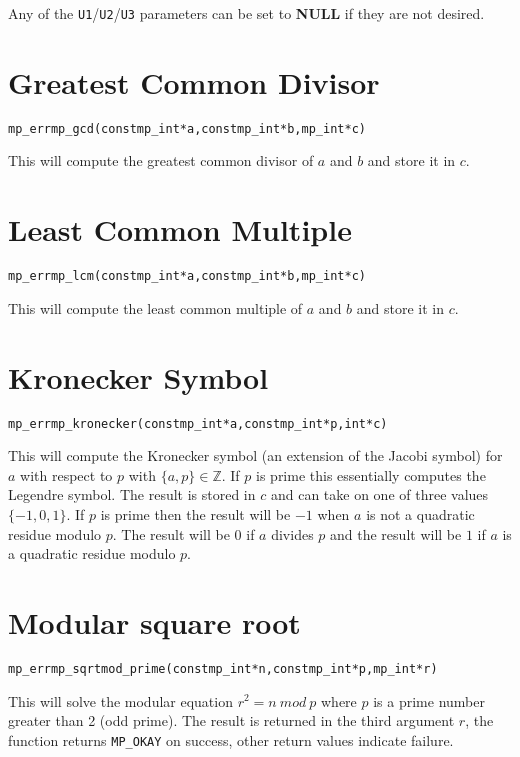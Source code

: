 \documentclass[synpaper]{book}
\def\mod{{\mathit\ mod\ }}
\begin{document}
Any of the \texttt{U1}/\texttt{U2}/\texttt{U3} parameters can be set to \textbf{NULL} if they are
not desired.

\section{Greatest Common Divisor}
\begin{alltt}
mp_err mp_gcd (const mp_int *a, const mp_int *b, mp_int *c)
\end{alltt}
This will compute the greatest common divisor of $a$ and $b$ and store it in $c$.

\section{Least Common Multiple}
\begin{alltt}
mp_err mp_lcm (const mp_int *a, const mp_int *b, mp_int *c)
\end{alltt}
This will compute the least common multiple of $a$ and $b$ and store it in $c$.

\section{Kronecker Symbol}
\begin{alltt}
mp_err mp_kronecker (const mp_int *a, const mp_int *p, int *c)
\end{alltt}
This will compute the Kronecker symbol (an extension of the Jacobi symbol) for $a$ with respect to
$p$ with $\lbrace a, p \rbrace \in \mathbb{Z}$.  If $p$ is prime this essentially computes the
Legendre symbol. The result is stored in $c$ and can take on one of three values $\lbrace -1, 0, 1
  \rbrace$.  If $p$ is prime then the result will be $-1$ when $a$ is not a quadratic residue
modulo
$p$.  The result will be $0$ if $a$ divides $p$ and the result will be $1$ if $a$ is a quadratic
residue modulo $p$.

\section{Modular square root}
\begin{alltt}
mp_err mp_sqrtmod_prime(const mp_int *n, const mp_int *p, mp_int *r)
\end{alltt}

This will solve the modular equation $r^2 = n \mod p$ where $p$ is a prime number greater than 2
(odd prime). The result is returned in the third argument $r$, the function returns
\texttt{MP\_OKAY} on success, other return values indicate failure.
\end{document}
